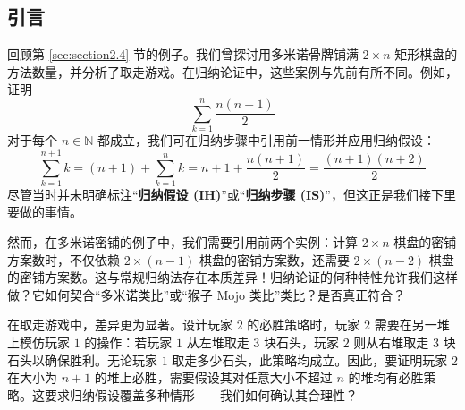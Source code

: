 \subsection{引言}

回顾第 \ref{sec:section2.4} 节的例子。我们曾探讨用多米诺骨牌铺满 $2 \times n$ 矩形棋盘的方法数量，并分析了取走游戏。在归纳论证中，这些案例与先前有所不同。例如，证明
\[\sum_{k=1}^{n} \frac{n(n+1)}{2}\]
对于每个 $n \in \mathbb{N}$ 都成立，我们可在归纳步骤中引用前一情形并应用归纳假设：
\[\sum_{k=1}^{n+1} k=(n+1)+\sum_{k=1}^{n}k = n+1+\frac{n(n+1)}{2} = \frac{(n+1)(n+2)}{2} \]
尽管当时并未明确标注``\textbf{归纳假设 (IH)}''或``\textbf{归纳步骤 (IS)}''，但这正是我们接下里要做的事情。

然而，在多米诺密铺的例子中，我们需要引用前两个实例：计算 $2 \times n$ 棋盘的密铺方案数时，不仅依赖 $2 \times (n-1)$ 棋盘的密铺方案数，还需要 $2 \times (n-2)$ 棋盘的密铺方案数。这与常规归纳法存在本质差异！归纳论证的何种特性允许我们这样做？它如何契合``多米诺类比''或``猴子 Mojo 类比''类比？是否真正符合？

在取走游戏中，差异更为显著。设计玩家 $2$ 的必胜策略时，玩家 $2$ 需要在另一堆上模仿玩家 $1$ 的操作：若玩家 $1$ 从左堆取走 $3$ 块石头，玩家 $2$ 则从右堆取走 $3$ 块石头以确保胜利。无论玩家 $1$ 取走多少石头，此策略均成立。因此，要证明玩家 $2$ 在大小为 $n + 1$ 的堆上必胜，需要假设其对任意大小不超过 $n$ 的堆均有必胜策略。这要求归纳假设覆盖多种情形——我们如何确认其合理性？
